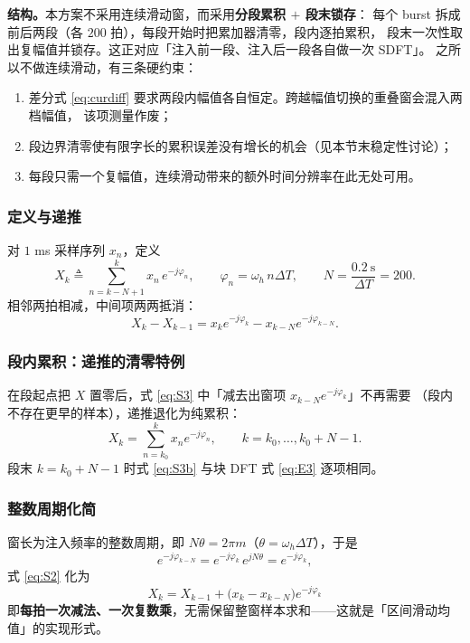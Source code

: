 \documentclass[11pt,a4paper]{ctexart}
\begin{document}
\textbf{结构。}本方案不采用连续滑动窗，而采用\textbf{分段累积 $+$ 段末锁存}：
每个 burst 拆成前后两段（各 $200$ 拍），每段开始时把累加器清零，段内逐拍累积，
段末一次性取出复幅值并锁存。这正对应「注入前一段、注入后一段各自做一次 SDFT」。
之所以不做连续滑动，有三条硬约束：

\begin{enumerate}
\item 差分式 \eqref{eq:curdiff} 要求两段内幅值各自恒定。跨越幅值切换的重叠窗会混入两档幅值，
该项测量作废；
\item 段边界清零使有限字长的累积误差没有增长的机会（见本节末稳定性讨论）；
\item 每段只需一个复幅值，连续滑动带来的额外时间分辨率在此无处可用。
\end{enumerate}

\subsubsection*{定义与递推}

对 $1$ ms 采样序列 $x_n$，定义
\begin{equation}
X_k\triangleq\sum_{n=k-N+1}^{k}x_n\,e^{-j\varphi_n},
\qquad \varphi_n=\omega_h\,n\Delta T,\qquad N=\frac{0.2\ \mathrm{s}}{\Delta T}=200 .
\label{eq:S1}
\end{equation}
相邻两拍相减，中间项两两抵消：
\begin{equation}
X_k-X_{k-1}=x_k e^{-j\varphi_k}-x_{k-N}e^{-j\varphi_{k-N}} .
\label{eq:S2}
\end{equation}

\subsubsection*{段内累积：递推的清零特例}

在段起点把 $X$ 置零后，式 \eqref{eq:S3} 中「减去出窗项 $x_{k-N}e^{-j\varphi_k}$」不再需要
（段内不存在更早的样本），递推退化为纯累积：
\begin{equation}
X_k=\sum_{n=k_0}^{k}x_n e^{-j\varphi_n},\qquad k=k_0,\ldots,k_0+N-1 .
\label{eq:S3b}
\end{equation}
段末 $k=k_0+N-1$ 时式 \eqref{eq:S3b} 与块 DFT 式 \eqref{eq:E3} 逐项相同。

\subsubsection*{整数周期化简}

窗长为注入频率的整数周期，即 $N\theta=2\pi m$（$\theta=\omega_h\Delta T$），于是
\begin{equation}
e^{-j\varphi_{k-N}}=e^{-j\varphi_k}\,e^{jN\theta}=e^{-j\varphi_k},
\end{equation}
式 \eqref{eq:S2} 化为
\begin{equation}
\boxed{\;X_k=X_{k-1}+\big(x_k-x_{k-N}\big)e^{-j\varphi_k}\;}
\label{eq:S3}
\end{equation}
即\textbf{每拍一次减法、一次复数乘}，无需保留整窗样本求和——这就是「区间滑动均值」的实现形式。
\end{document}
